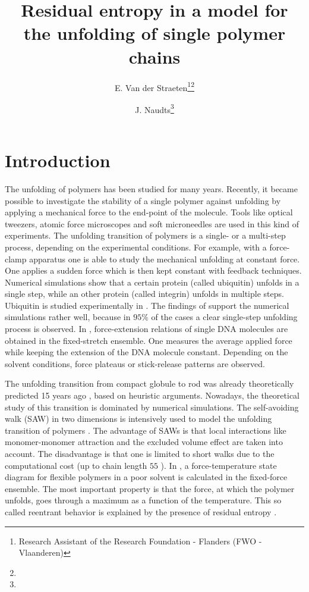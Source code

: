 \documentclass[doublecol,figures]{epl2}
\title{Residual entropy in a model for the unfolding of single
polymer chains}
\author{E. Van der Straeten\thanks{Research Assistant of the Research
Foundation - Flanders (FWO - Vlaanderen)}\thanks{\email{Erik.VanderStraeten@ua.ac.be}}\and J. Naudts\thanks{\email{Jan.Naudts@ua.ac.be}}}
\institute{                    
  \inst{1} Departement Fysica, Universiteit Antwerpen, Groenenborgerlaan 171,
2020 Antwerpen, Belgium
}
\begin{document}
\maketitle

\section{Introduction}
The unfolding of polymers has been studied for many years. Recently, it became
possible to investigate the stability of a single polymer against unfolding by
applying a mechanical force to the end-point of the molecule.
Tools like optical tweezers, atomic force microscopes and
soft microneedles are used in this kind of experiments. The unfolding transition
of polymers is a single- or a multi-step process, depending on the experimental
conditions. For example, with a force-clamp apparatus one is able to study the mechanical
unfolding at constant force. One applies a sudden force which is then kept
constant with feedback techniques. Numerical simulations \cite{referee1} show that a certain protein (called ubiquitin) unfolds in a single step, while an other protein (called integrin) unfolds in multiple steps. Ubiquitin is studied experimentally in \cite{referee2}. The findings of \cite{referee2} support the numerical simulations rather well, because in $95\%$ of the cases a clear single-step unfolding process is observed. In \cite{referee3,referee4}, force-extension relations of single DNA molecules are
obtained in the fixed-stretch ensemble. One measures the average applied force
while keeping the extension of the DNA molecule constant. Depending on the
solvent conditions, force plateaus or stick-release patterns are observed. 

The unfolding transition from compact globule to rod was already
theoretically predicted 15 years ago \cite{referee5}, based on heuristic
arguments. Nowadays, the theoretical study of this transition is dominated by
numerical simulations. The self-avoiding walk (SAW) in two dimensions is
intensively used to model the unfolding transition of polymers
\cite{referee6,referee7,referee8}. The advantage of SAWs is that local
interactions like monomer-monomer attraction and the excluded volume effect are
taken into account. The disadvantage is that one is limited to short walks due
to the computational cost (up to chain length $55$ \cite{referee7}). In
\cite{referee6,referee7,referee8}, a force-temperature state diagram for
flexible polymers in a poor solvent is calculated in the fixed-force ensemble.
The most important property is that the force, at which the polymer unfolds,
goes through a maximum as a function of the temperature. This so called
reentrant behavior is explained by the presence of residual entropy
\cite{referee6}. 
\end{document}
